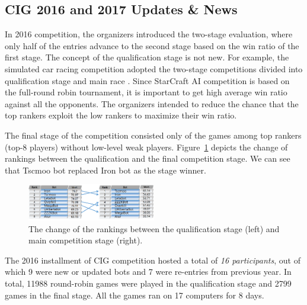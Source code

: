 \subsection*{CIG 2016 and 2017 Updates \& News}\label{subsecCIGnews}

In 2016 competition, the organizers introduced the two-stage evaluation, where only half of the entries advance to the second stage based on the win ratio of the first stage. The concept of the qualification stage is not new. For example, the simulated car racing competition adopted the two-stage competitions divided into qualification stage and main race \cite{loiacono20102009}. Since StarCraft AI competition is based on the full-round robin tournament, it is important to get high average win ratio against all the opponents. The organizers intended to reduce the chance that the top rankers exploit the low rankers to maximize their win ratio. 

The final stage of the competition consisted only of the games among top rankers (top-8 players) without low-level weak players. Figure~\ref{figCIGtwostages} depicts the change of rankings between the qualification and the final competition stage. We can see that Tscmoo bot replaced Iron bot as the stage winner. 

\begin{figure}[h]
  \centering
  \includegraphics[width=0.5\textwidth]{fig/cig-two-stage-result.png}
  \caption{The change of the rankings between the qualification stage (left) and main competition stage (right).}
  \label{figCIGtwostages}
\end{figure}

The 2016 installment of CIG competition hosted a total of {\em 16 participants}, out of which 9 were new or updated bots and 7 were re-entries from previous year. 
In total, 11988 round-robin games were played in the qualification stage and 2799 games in the final stage. 
All the games ran on 17 computers for 8 days. 

